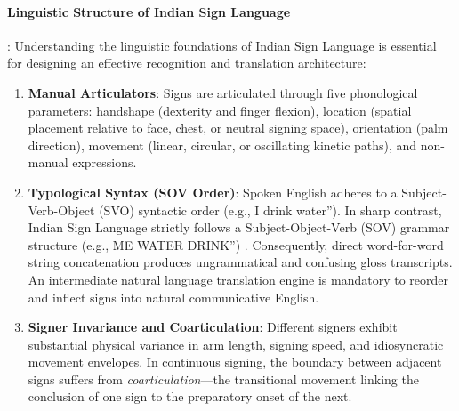 \paragraph{Linguistic Structure of Indian Sign Language}:
Understanding the linguistic foundations of Indian Sign Language is essential for designing an effective recognition and translation architecture:
\begin{enumerate}
    \item \textbf{Manual Articulators}: Signs are articulated through five phonological parameters: handshape (dexterity and finger flexion), location (spatial placement relative to face, chest, or neutral signing space), orientation (palm direction), movement (linear, circular, or oscillating kinetic paths), and non-manual expressions.
    \item \textbf{Typological Syntax (SOV Order)}: Spoken English adheres to a Subject-Verb-Object (SVO) syntactic order (e.g., I drink water''). In sharp contrast, Indian Sign Language strictly follows a Subject-Object-Verb (SOV) grammar structure (e.g., ME WATER DRINK'') \cite{13,18}. Consequently, direct word-for-word string concatenation produces ungrammatical and confusing gloss transcripts. An intermediate natural language translation engine is mandatory to reorder and inflect signs into natural communicative English.
    \item \textbf{Signer Invariance and Coarticulation}: Different signers exhibit substantial physical variance in arm length, signing speed, and idiosyncratic movement envelopes. In continuous signing, the boundary between adjacent signs suffers from \textit{coarticulation}---the transitional movement linking the conclusion of one sign to the preparatory onset of the next.
\end{enumerate}

